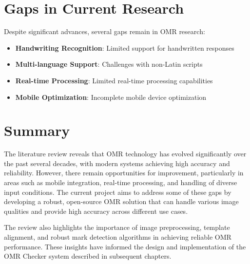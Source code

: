 \section{Gaps in Current Research}

Despite significant advances, several gaps remain in OMR research:

\begin{itemize}
\item \textbf{Handwriting Recognition}: Limited support for handwritten responses
\item \textbf{Multi-language Support}: Challenges with non-Latin scripts
\item \textbf{Real-time Processing}: Limited real-time processing capabilities
\item \textbf{Mobile Optimization}: Incomplete mobile device optimization
\end{itemize}

\section{Summary}

The literature review reveals that OMR technology has evolved significantly over the past several decades, with modern systems achieving high accuracy and reliability. However, there remain opportunities for improvement, particularly in areas such as mobile integration, real-time processing, and handling of diverse input conditions. The current project aims to address some of these gaps by developing a robust, open-source OMR solution that can handle various image qualities and provide high accuracy across different use cases.

The review also highlights the importance of image preprocessing, template alignment, and robust mark detection algorithms in achieving reliable OMR performance. These insights have informed the design and implementation of the OMR Checker system described in subsequent chapters.